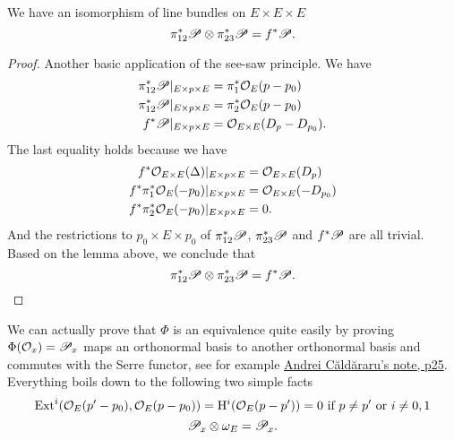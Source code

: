 \documentclass[../main.tex]{subfiles}
\begin{document}
\begin{lemma}
We have an isomorphism of line bundles on $E\times E\times E$
$$\pi_{12}^{*}\mathscr{P}\otimes \pi_{23}^{*}\mathscr{P}=f^{*}\mathscr{P}.$$
\end{lemma}
\begin{proof}
Another basic application of the see-saw principle. We have
\begin{align*}\pi_{12}^{*}\mathscr{P}|_{E\times p\times E}&=\pi_{1}^{*}\mathcal{O}_{E}(p-p_{0})\\
\pi_{12}^{*}\mathscr{P}|_{E\times p\times E}&=\pi_{2}^{*}\mathcal{O}_{E}(p-p_{0})\\
f^{*}\mathscr{P}|_{E\times p\times E}&=\mathcal{O}_{E\times E}(D_{p}-D_{p_{0}}).
\end{align*}
The last equality holds because we have 
\begin{align*}f^{*}\mathcal{O}_{E\times E}(\Delta)|_{E\times p\times E}&=\mathcal{O}_{E\times E}(D_{p})\\ f^{*}\pi_{1}^{*}\mathcal{O}_{E}(-p_{0})|_{E\times p\times E}&=\mathcal{O}_{E\times E}(-D_{p_{0}})\\ f^{*}\pi_{2}^{*}\mathcal{O}_{E}(-p_{0})|_{E\times p\times E}&=0.
\end{align*}
And the restrictions to $p_{0}\times E\times p_{0}$ of $\pi_{12}^{*}\mathscr{P}$, $\pi_{23}^{*}\mathscr{P}$ and $f^{*}\mathscr{P}$ are all trivial. Based on the lemma above, we conclude that 
$$\pi_{12}^{*}\mathscr{P}\otimes \pi_{23}^{*}\mathscr{P}=f^{*}\mathscr{P}.$$
\end{proof}
We can actually prove that $\Phi$ is an equivalence quite easily by proving $\Phi(\mathcal{O}_{x})=\mathscr{P}_{x}$ maps an orthonormal basis to another orthonormal basis and commutes with the Serre functor, see for example \href{http://www.math.wisc.edu/~andreic/publications/lnPoland.pdf}{Andrei Căldăraru's note, p25}. Everything boils down to the following two simple facts
$$\mathrm{Ext}^{i}(\mathcal{O}_{E}(p'-p_{0}), \mathcal{O}_{E}(p-p_{0}))=\mathrm{H}^{i}(\mathcal{O}_{E}(p-p'))=0 \text{ if $p\neq p'$ or $i\neq 0, 1$}$$
$$\mathscr{P}_{x}\otimes \omega_{E}=\mathscr{P}_{x}.$$
\end{document}
